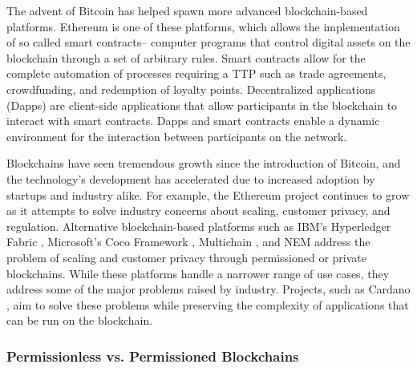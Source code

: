 The advent of Bitcoin has helped spawn more advanced blockchain-based platforms. Ethereum \cite{Wood14} is one of these platforms, which allows the implementation of so called smart contracts-- computer programs that control digital assets on the blockchain through a set of arbitrary rules. Smart contracts allow for the complete automation of processes requiring a TTP such as trade agreements, crowdfunding, and redemption of loyalty points. Decentralized applications (Dapps) are client-side applications that allow participants in the blockchain to interact with smart contracts. Dapps and smart contracts enable a dynamic environment for the interaction between participants on the network. %
%

Blockchains have seen tremendous growth since the introduction of Bitcoin, and the technology's development has accelerated due to increased adoption by startups and industry alike. For example, the Ethereum project continues to grow as it attempts to solve industry concerns about scaling, customer privacy, and regulation. Alternative blockchain-based platforms such as IBM's Hyperledger Fabric \cite{HL16}, Microsoft's Coco Framework \cite{Coco17}, Multichain \cite{MC16}, and NEM \cite{NEM} address the problem of scaling and customer privacy through permissioned or private blockchains. While these platforms handle a narrower range of use cases, they address some of the major problems raised by industry. Projects, such as Cardano \cite{Cardano}, aim to solve these problems while preserving the complexity of applications that can be run on the blockchain.

\subsubsection{Permissionless vs. Permissioned Blockchains}

